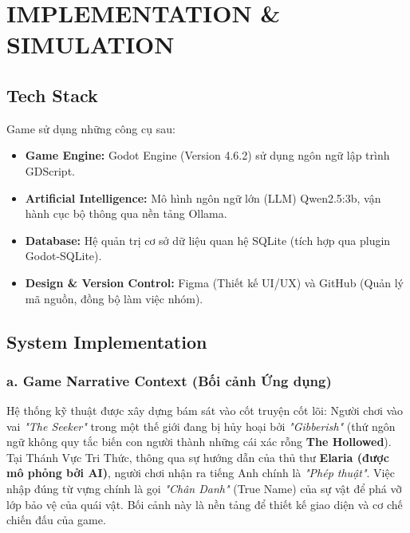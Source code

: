 \section{IMPLEMENTATION \& SIMULATION}
\subsection{Tech Stack}
Game sử dụng những công cụ sau:
\begin{itemize}
	\item \textbf{Game Engine:} Godot Engine (Version 4.6.2) sử dụng ngôn ngữ lập trình GDScript.
	\item \textbf{Artificial Intelligence:} Mô hình ngôn ngữ lớn (LLM) Qwen2.5:3b, vận hành cục bộ thông qua nền tảng Ollama.
	\item \textbf{Database:} Hệ quản trị cơ sở dữ liệu quan hệ SQLite (tích hợp qua plugin Godot-SQLite).
	\item \textbf{Design \& Version Control:} Figma (Thiết kế UI/UX) và GitHub (Quản lý mã nguồn, đồng bộ làm việc nhóm).
\end{itemize}

\subsection{System Implementation}
\subsubsection*{a. Game Narrative Context (Bối cảnh Ứng dụng)}
Hệ thống kỹ thuật được xây dựng bám sát vào cốt truyện cốt lõi: Người chơi vào vai \textit{"The Seeker"} trong một thế giới đang bị hủy hoại bởi \textit{"Gibberish"} (thứ ngôn ngữ không quy tắc biến con người thành những cái xác rỗng \textbf{The Hollowed}). Tại Thánh Vực Tri Thức, thông qua sự hướng dẫn của thủ thư \textbf{Elaria (được mô phỏng bởi AI)}, người chơi nhận ra tiếng Anh chính là \textit{"Phép thuật"}. Việc nhập đúng từ vựng chính là gọi \textit{"Chân Danh"} (True Name) của sự vật để phá vỡ lớp bảo vệ của quái vật. Bối cảnh này là nền tảng để thiết kế giao diện và cơ chế chiến đấu của game.
